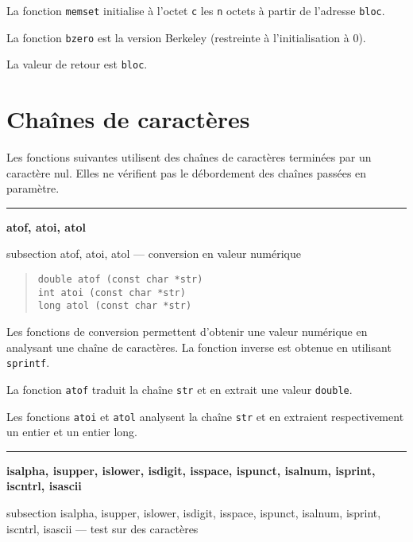 \documentclass [twoside] {report}
\newcommand {\primitive} [1]
    {
	{\large \bf #1}
	\addcontentsline {toc} {subsection} {#1}
    }
\newcommand {\separation}
    {
	\vspace {7mm}
	\nopagebreak
	\hrule
    }
\begin{document}
La fonction {\tt memset} initialise à l'octet {\tt c} les {\tt n}
octets à partir de l'adresse {\tt bloc}.

La fonction {\tt bzero} est la version Berkeley (restreinte à
l'initialisation à 0).

La valeur de retour est {\tt bloc}.




\section {Chaînes de caractères}



Les fonctions suivantes utilisent des chaînes de caractères
terminées par un caractère nul. Elles ne vérifient pas le
débordement des chaînes passées en paramètre.




\separation
\primitive {atof, atoi, atol} --- conversion en valeur numérique


\begin {quote}
\begin {verbatim}
double atof (const char *str)
int atoi (const char *str)
long atol (const char *str)
\end{verbatim}
\end {quote}

Les fonctions de conversion permettent d'obtenir une valeur
numérique en analysant une chaîne de caractères. La fonction
inverse est obtenue en utilisant {\tt sprintf}.

La fonction {\tt atof} traduit la chaîne {\tt str} et en extrait une
valeur {\tt double}.

Les fonctions {\tt atoi} et {\tt atol} analysent la chaîne
{\tt str} et en extraient respectivement un entier et un entier
long.


\separation 
\primitive {isalpha, isupper, islower, isdigit, isspace, ispunct, isalnum, \mbox {isprint}, iscntrl, isascii} --- test sur des caractères
\end{document}
